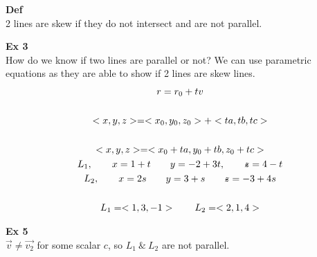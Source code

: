 \documentclass{article}
\begin{document}
  \textbf{Def}\\
  2 lines are skew if they do not intersect and are not parallel.

  \textbf{Ex 3}\\
  How do we know if two lines are parallel or not? We can use parametric equations as they are able to show if 2 lines are skew lines.
  \[
    \begin{gathered}
      r = r_{0}+tv\\
      ~\\
      <x,y,z>=<x_{0},y_{0},z_{0}>+<ta,tb,tc>\\
      ~\\
      < x, y, z> = < x_{0}+ta, y_{0}+tb ,z_{0}+tc  >\\ 
    L_{1},\qquad x=1+t \qquad y=-2+3t, \qquad \zstroke=4-t\\
    L_{2},\qquad x=2s \qquad y=3+s \qquad \zstroke=-3+4s\\
    ~\\
    L_{1}=< 1, 3, -1> \qquad L_{2}=< 2, 1, 4>    
    \end{gathered}
  \]
  
  \textbf{Ex 5}\\
  $ \vec{v} \neq \vec{v_{2} } $ for some scalar $ c $, so $ L_{1} ~\&~L_{2}$ are not parallel.    
  
\end{document}
